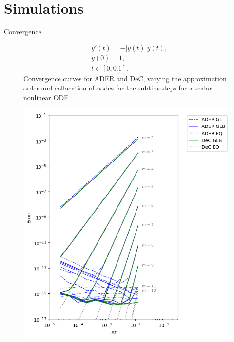 \documentclass[aspectratio=169]{beamer}
\begin{document}
\section{Simulations}
\begin{frame}{Convergence}

\begin{figure}
\begin{minipage}[c]{0.55\linewidth}
\begin{equation}
\label{eq:scalar-nonlinear}
\begin{split}
&y'(t) = - |y(t)| y(t) ,\\
&y(0) = 1,\\
&t\in [0,0.1].
\end{split}
\end{equation}
Convergence curves for ADER and DeC, varying the approximation order and collocation of nodes for the subtimesteps for a scalar nonlinear ODE 
\end{minipage}
\hfill
\begin{minipage}[c]{0.4\linewidth}
\includegraphics[width=\linewidth]{scalar-2.png}
\end{minipage}%
\end{figure}


\end{frame}
\end{document}
